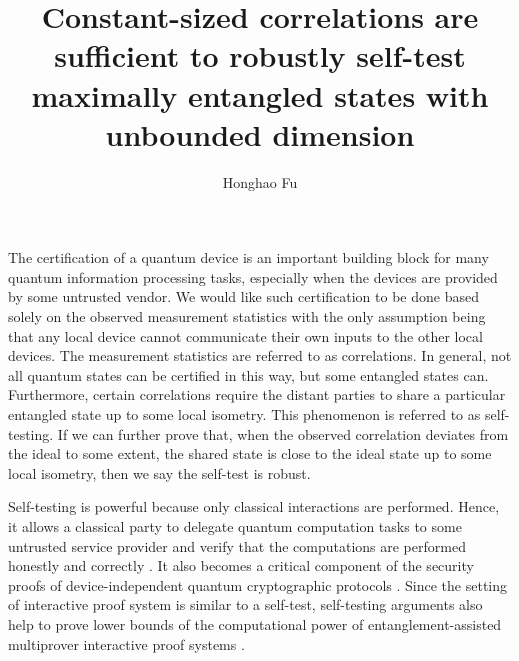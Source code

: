 \documentclass[11pt,letterpaper]{article}
\date{}
\newcommand{\1}{\mathbb{1}}
\theoremstyle{definition}
\begin{document}
\title{Constant-sized correlations are sufficient to 
robustly self-test maximally entangled states with unbounded dimension}

\author{Honghao Fu}

\maketitle

The certification of a quantum device is an important building block
for many quantum information processing tasks, especially
when the devices are provided by some untrusted vendor.
We would like such certification to be done based solely on
the observed measurement statistics with the only assumption being that
any local device cannot communicate their own
inputs to the other local devices. 
The measurement statistics are referred to as correlations.
In general, not all quantum states can be certified in this way, but some entangled states
can. Furthermore, certain correlations require the distant parties to share
a particular entangled state up to some local isometry. 
This phenomenon is referred to as self-testing.  
If we can further prove that, when the observed correlation deviates from the ideal to some extent, 
the shared state is close to the ideal state up to some local isometry,
then we say the self-test is robust. 

Self-testing is powerful because only classical interactions are performed.
Hence, it allows a classical party to delegate quantum computation tasks to some untrusted service provider
and verify that the computations are performed
honestly and correctly \cite{ruv2013,coladan2017verifier}.
It also becomes a critical component of the security proofs of device-independent quantum cryptographic protocols
\cite{mayersyao,vv2014,miller2017,fu2018,eat2018}.
Since the setting of interactive proof system is similar to a self-test, self-testing arguments also help to prove
lower bounds of the computational power of entanglement-assisted
multiprover interactive proof systems \cite{fitzsimons2019, neexp}.
\end{document}
